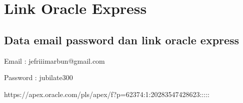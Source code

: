 \chapter*{Link Oracle Express}
\section*{Data email password dan link oracle express} 


\item Email : jefriiimarbun@gmail.com
\item Password : jubilate300
\item https://apex.oracle.com/pls/apex/f?p=62374:1:20283547428623:::::

	
	
	

